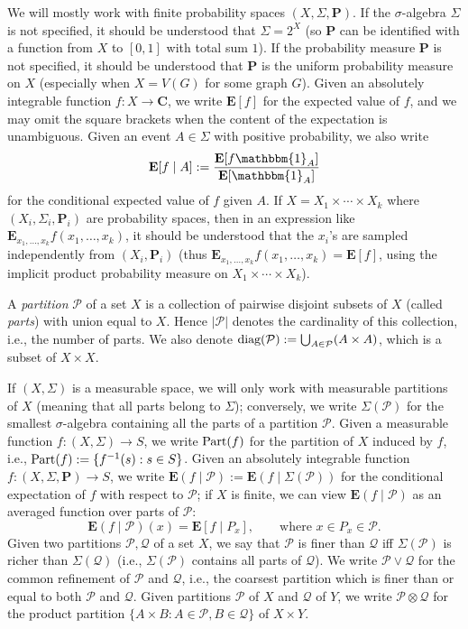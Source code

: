 \documentclass[reqno,11pt]{amsart}
\theoremstyle{definition}
\theoremstyle{remark}
\numberwithin{equation}{section}
\newcommand{\C}{\mathbf{C}}
\renewcommand{\P}{\mathbf{P}}
\newcommand{\E}{\mathbf{E}}
\newcommand{\mP}{\mathcal{P}}
\newcommand{\mQ}{\mathcal{Q}}
\newcommand{\one}{\mathbbm{1}}
\newcommand{\Part}{\textnormal{Part}}
\newcommand{\diag}{\textnormal{diag}}
\begin{document}
We will mostly work with finite probability spaces $(X, \Sigma, \P)$. If the $\sigma$-algebra $\Sigma$ is not specified, it should be understood that $\Sigma = 2^X$ (so $\P$ can be identified with a function from $X$ to $[0, 1]$ with total sum $1$). If the probability measure $\P$ is not specified, it should be understood that $\P$ is the uniform probability measure on $X$ (especially when $X = V(G)$ for some graph $G$). Given an absolutely integrable function $f : X \to \C$, we write $\E[f]$ for the expected value of $f$, and we may omit the square brackets when the content of the expectation is unambiguous. Given an event $A \in \Sigma$ with positive probability, we also write
\[
    \E[f \mid A] := \frac{\E[f \one_A]}{\E[\one_A]}
\]
for the conditional expected value of $f$ given $A$. If $X = X_1 \times \cdots \times X_k$ where $(X_i, \Sigma_i, \P_i)$ are probability spaces, then in an expression like $\E_{x_1, \ldots, x_k} f(x_1, \ldots, x_k)$, it should be understood that the $x_i$'s are sampled independently from $(X_i, \P_i)$ (thus $\E_{x_1, \ldots, x_k} f(x_1, \ldots, x_k) = \E[f]$, using the implicit product probability measure on $X_1 \times \cdots \times X_k$).

A \emph{partition} $\mP$ of a set $X$ is a collection of pairwise disjoint subsets of $X$ (called \emph{parts}) with union equal to $X$. Hence $|\mP|$ denotes the cardinality of this collection, i.e., the number of parts. We also denote $\diag(\mP) := \bigcup_{A \in \mP} (A \times A)$, which is a subset of $X \times X$.

If $(X, \Sigma)$ is a measurable space, we will only work with measurable partitions of $X$ (meaning that all parts belong to $\Sigma$); conversely, we write $\Sigma(\mP)$ for the smallest $\sigma$-algebra containing all the parts of a partition $\mP$. Given a measurable function $f : (X, \Sigma) \to S$, we write $\Part(f)$ for the partition of $X$ induced by $f$, i.e., $\Part(f) := \{f^{-1}(s) : s \in S\}$. Given an absolutely integrable function $f : (X, \Sigma, \P) \to S$, we write $\E(f \mid \mP) := \E(f \mid \Sigma(\mP))$ for the conditional expectation of $f$ with respect to $\mP$; if $X$ is finite, we can view $\E(f \mid \mP)$ as an averaged function over parts of $\mP$:
\begin{equation} \label{eq:conditional-exp}
    \E(f \mid \mP)(x) = \E[f \mid P_x],
    \qquad 
    \text{where } x \in P_x \in \mP.
\end{equation}
Given two partitions $\mP, \mQ$ of a set $X$, we say that $\mP$ is finer than $\mQ$ iff $\Sigma(\mP)$ is richer than $\Sigma(\mQ)$ (i.e., $\Sigma(\mP)$ contains all parts of $\mQ$). We write $\mP \vee \mQ$ for the common refinement of $\mP$ and $\mQ$, i.e., the coarsest partition which is finer than or equal to both $\mP$ and $\mQ$. Given partitions $\mP$ of $X$ and $\mQ$ of $Y$, we write $\mP \otimes \mQ$ for the product partition $\{A \times B : A \in \mP, B \in \mQ\}$ of $X \times Y$.
\end{document}
